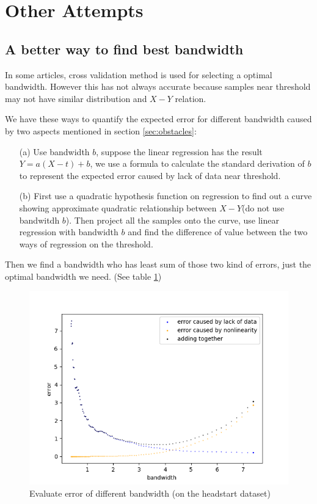 \documentclass[a4 paper,12pt]{article}
\begin{document}
\section{Other Attempts}
\subsection*{A better way to find best bandwidth}

In some articles, cross validation method is used for selecting a optimal bandwidth. However this has not always accurate because samples near threshold may not have similar distribution and $X-Y$ relation.

We have these ways to quantify the expected error for different bandwidth caused by two aspects mentioned in section \ref{sec:obstacles}:

\begin{enumerate}
   \item[(a)] Use bandwidth $b$, suppose the linear regression has the result $Y=a(X-t)+b$, we use a formula to calculate the standard derivation of $b$ to represent the expected error caused by lack of data near threshold.
   \item[(b)] First use a quadratic hypothesis function on regression to find out a curve showing approximate quadratic relationship between $X-Y$(do not use bandwitdh $b$). Then project all the samples onto the curve, use linear regression with bandwidth $b$ and find the difference of value between the two ways of regression on the threshold. 
\end{enumerate}

Then we find a bandwidth who has least sum of those two kind of errors, just the optimal bandwidth we need. (See table \ref{table:opt bandwidth})

\begin{figure}[h]
	\centering
	\includegraphics[scale=1]{Figure_5.png}
	\caption{Evaluate error of different bandwidth (on the headstart dataset)}
	\label{table:opt bandwidth}
\end{figure}
\end{document}
